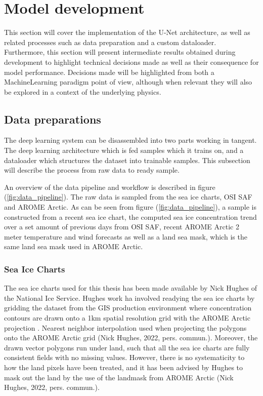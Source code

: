 \documentclass[../main/thesis]{subfiles}
\begin{document}
\section{Model development}
\label{sec:developing a unet}
This section will cover the implementation of the U-Net architecture, as well as related processes such as data preparation and a custom dataloader. Furthermore, this section will present intermediate results obtained during development to highlight technical decisions made as well as their consequence for model performance. Decisions made will be highlighted from both a MachineLearning paradigm point of view, although when relevant they will also be explored in a context of the underlying physics.

\subsection{Data preparations}
The deep learning system can be disassembled into two parts working in tangent. The deep learning architecture which is fed samples which it trains on, and a dataloader which structures the dataset into trainable samples. This subsection will describe the process from raw data to ready sample.

An overview of the data pipeline and workflow is described in figure (\ref{fig:data_pipeline}). The raw data is sampled from the sea ice charts, OSI SAF and AROME Arctic. As can be seen from figure (\ref{fig:data_pipeline}), a sample is constructed from a recent sea ice chart, the computed sea ice concentration trend over a set amount of previous days from OSI SAF, recent AROME Arctic 2 meter temperature and wind forecasts as well as a land sea mask, which is the same land sea mask used in AROME Arctic.

\subsubsection{Sea Ice Charts}
The sea ice charts used for this thesis has been made available by Nick Hughes of the National Ice Service. Hughes work ha involved readying the sea ice charts by gridding the dataset from the GIS production environment \citep{Dinessen2020} where concentration contours are drawn onto a 1km spatial resolution grid with the AROME Arctic projection \citep{Mueller2017}. Nearest neighbor interpolation used when projecting the polygons onto the AROME Arctic grid (Nick Hughes, 2022, pers. commun.). Moreover, the drawn vector polygons run under land, such that all the sea ice charts are fully consistent fields with no missing values. However, there is no systematicity to how the land pixels have been treated, and it has been advised by Hughes to mask out the land by the use of the landmask from AROME Arctic (Nick Hughes, 2022, pers. commun.).
\end{document}
